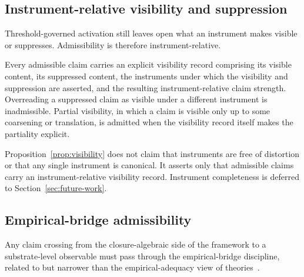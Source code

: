 \subsection{Instrument-relative visibility and suppression}\label{subsec:visibility-suppression}

Threshold-governed activation still leaves open what an instrument
makes visible or suppresses. Admissibility is therefore
instrument-relative.

\begin{proposition}\label{prop:visibility}
Every admissible claim carries an explicit visibility record comprising
its visible content, its suppressed content, the instruments under which
the visibility and suppression are asserted, and the resulting
instrument-relative claim strength. Overreading a suppressed claim as
visible under a different instrument is inadmissible. Partial visibility,
in which a claim is visible only up to some coarsening or translation, is
admitted when the visibility record itself makes the partiality explicit.
\end{proposition}

\begin{remark}\label{rem:no-instrument-free}
Proposition~\ref{prop:visibility} does not claim that instruments are
free of distortion or that any single instrument is canonical. It
asserts only that admissible claims carry an instrument-relative
visibility record. Instrument completeness is deferred to
Section~\ref{sec:future-work}.
\end{remark}

\subsection{Empirical-bridge admissibility}\label{subsec:empirical-bridge}

Any claim crossing from the closure-algebraic side of the framework
to a substrate-level observable must pass through the
empirical-bridge discipline, related to but narrower than
the empirical-adequacy view of theories~\citep{vanFraassen1980}.

